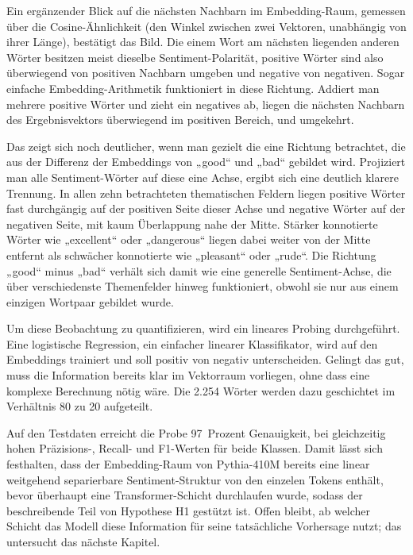 Ein ergänzender Blick auf die nächsten Nachbarn im Embedding-Raum, gemessen über die Cosine-Ähnlichkeit (den Winkel zwischen zwei Vektoren, unabhängig von ihrer Länge), bestätigt das Bild. Die einem Wort am nächsten liegenden anderen Wörter besitzen meist dieselbe Sentiment-Polarität, positive Wörter sind also überwiegend von positiven Nachbarn umgeben und negative von negativen. Sogar einfache Embedding-Arithmetik funktioniert in diese Richtung. Addiert man mehrere positive Wörter und zieht ein negatives ab, liegen die nächsten Nachbarn des Ergebnisvektors überwiegend im positiven Bereich, und umgekehrt.

Das zeigt sich noch deutlicher, wenn man gezielt die eine Richtung betrachtet, die aus der Differenz der Embeddings von „good“ und „bad“ gebildet wird. Projiziert man alle Sentiment-Wörter auf diese eine Achse, ergibt sich eine deutlich klarere Trennung. In allen zehn betrachteten thematischen Feldern liegen positive Wörter fast durchgängig auf der positiven Seite dieser Achse und negative Wörter auf der negativen Seite, mit kaum Überlappung nahe der Mitte. Stärker konnotierte Wörter wie „excellent“ oder „dangerous“ liegen dabei weiter von der Mitte entfernt als schwächer konnotierte wie „pleasant“ oder „rude“. Die Richtung „good“ minus „bad“ verhält sich damit wie eine generelle Sentiment-Achse, die über verschiedenste Themenfelder hinweg funktioniert, obwohl sie nur aus einem einzigen Wortpaar gebildet wurde.

Um diese Beobachtung zu quantifizieren, wird ein lineares Probing durchgeführt. Eine logistische Regression, ein einfacher linearer Klassifikator, wird auf den Embeddings trainiert und soll positiv von negativ unterscheiden. Gelingt das gut, muss die Information bereits klar im Vektorraum vorliegen, ohne dass eine komplexe Berechnung nötig wäre. Die 2.254 Wörter werden dazu geschichtet im Verhältnis 80 zu 20 aufgeteilt.


Auf den Testdaten erreicht die Probe 97~Prozent Genauigkeit, bei gleichzeitig hohen Präzisions-, Recall- und F1-Werten für beide Klassen. Damit lässt sich festhalten, dass der Embedding-Raum von Pythia-410M bereits eine linear weitgehend separierbare Sentiment-Struktur von den einzelen Tokens enthält, bevor überhaupt eine Transformer-Schicht durchlaufen wurde, sodass der beschreibende Teil von Hypothese H1 gestützt ist. Offen bleibt, ab welcher Schicht das Modell diese Information für seine tatsächliche Vorhersage nutzt; das untersucht das nächste Kapitel.
